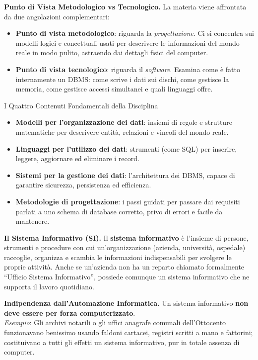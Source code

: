 \documentclass[12pt]{extarticle}
\begin{document}
\medskip
\noindent \textbf{Punto di Vista Metodologico vs Tecnologico.} La materia viene affrontata da due angolazioni complementari:
\begin{itemize}
    \item \textbf{Punto di vista metodologico}: riguarda la \textit{progettazione}. Ci si concentra sui modelli logici e concettuali usati per descrivere le informazioni del mondo reale in modo pulito, astraendo dai dettagli fisici del computer.
    \item \textbf{Punto di vista tecnologico}: riguarda il \textit{software}. Esamina come è fatto internamente un DBMS: come scrive i dati sui dischi, come gestisce la memoria, come gestisce accessi simultanei e quali linguaggi offre.
\end{itemize}

\begin{cbox}{I Quattro Contenuti Fondamentali della Disciplina}
\begin{itemize}
    \item \textbf{Modelli per l'organizzazione dei dati}: insiemi di regole e strutture matematiche per descrivere entità, relazioni e vincoli del mondo reale.
    \item \textbf{Linguaggi per l'utilizzo dei dati}: strumenti (come SQL) per inserire, leggere, aggiornare ed eliminare i record.
    \item \textbf{Sistemi per la gestione dei dati}: l'architettura dei DBMS, capace di garantire sicurezza, persistenza ed efficienza.
    \item \textbf{Metodologie di progettazione}: i passi guidati per passare dai requisiti parlati a uno schema di database corretto, privo di errori e facile da mantenere.
\end{itemize}
\end{cbox}

\medskip
\noindent \textbf{Il Sistema Informativo (SI).} Il \textbf{sistema informativo} è l'insieme di persone, strumenti e procedure con cui un'organizzazione (azienda, università, ospedale) raccoglie, organizza e scambia le informazioni indispensabili per svolgere le proprie attività. Anche se un'azienda non ha un reparto chiamato formalmente ``Ufficio Sistema Informativo'', possiede comunque un sistema informativo che ne supporta il lavoro quotidiano.

\medskip
\noindent \textbf{Indipendenza dall'Automazione Informatica.} Un sistema informativo \textbf{non deve essere per forza computerizzato}. \\
\textit{Esempio}: Gli archivi notarili o gli uffici anagrafe comunali dell'Ottocento funzionavano benissimo usando faldoni cartacei, registri scritti a mano e fattorini; costituivano a tutti gli effetti un sistema informativo, pur in totale assenza di computer.
\end{document}
